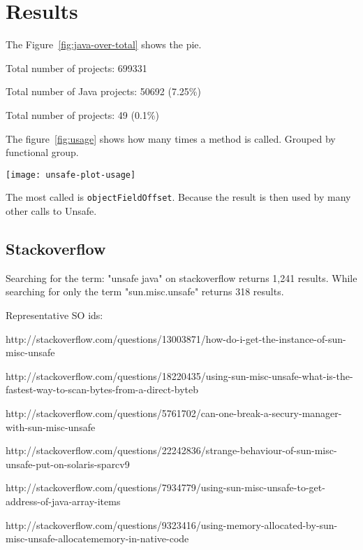 
\section{Results} \label{sec:results}

The Figure~\ref{fig:java-over-total} shows the pie.

 Total number of projects: 699331

Total number of Java projects: 50692 (7.25\%)

Total number of projects: 49 (0.1\%)


The figure~\ref{fig:usage} shows how many times a method is called. Grouped by functional group.

\begin{figure*}[htb]
\texttt{[image: unsafe-plot-usage]}
\caption{sun.misc.Unsafe methods usage} \label{fig:usage}
\end{figure*}

The most called is \texttt{objectFieldOffset}. Because the result is then used by many other calls to Unsafe.






\subsection{Stackoverflow}

Searching for the term: "unsafe java" on stackoverflow returns 1,241 results.
While searching for only the term "sun.misc.unsafe" returns 318 results.

Representative SO ids:

http://stackoverflow.com/questions/13003871/how-do-i-get-the-instance-of-sun-misc-unsafe

http://stackoverflow.com/questions/18220435/using-sun-misc-unsafe-what-is-the-fastest-way-to-scan-bytes-from-a-direct-byteb

http://stackoverflow.com/questions/5761702/can-one-break-a-secury-manager-with-sun-misc-unsafe

http://stackoverflow.com/questions/22242836/strange-behaviour-of-sun-misc-unsafe-put-on-solaris-sparcv9

http://stackoverflow.com/questions/7934779/using-sun-misc-unsafe-to-get-address-of-java-array-items

http://stackoverflow.com/questions/9323416/using-memory-allocated-by-sun-misc-unsafe-allocatememory-in-native-code


